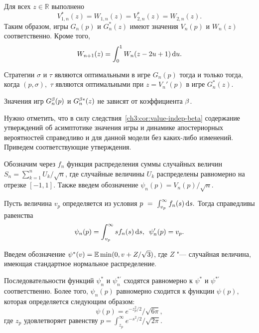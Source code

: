 {\begin{theorem}
  Для всех $z \in \mathbb{R}$ выполнено
  \begin{equation}\label{ch3:eq:duality-relationships}
    V_{1,n}^*(z) = W_{1,n}(z) = V_{2,n}^*(z) = W_{2,n}(z).
  \end{equation}
  Таким образом, игры $G_n(p)$ и $G_n^*(z)$ имеют значения $V_n(p)$ и $W_n(z)$ соответственно.
  Кроме того,
  \begin{equation}\label{ch3:eq:W-recursive}
    W_{n+1}(z) = \int_0^1 W_n(z - 2u + 1) \mathop{}\!\mathrm{d} u.
  \end{equation}
\end{theorem}

\begin{theorem}\label{ch3:thm:optimal-strategies}
  Стратегии $\sigma$ и $\tau$ являются оптимальными в игре $G_n(p)$ тогда и только тогда, когда $(p, \sigma),$ $\tau$ являются оптимальными при $z = V_n'(p)$ в игре $G_n^*(z)$.
\end{theorem}

\begin{corollary}
  \label{ch3:cor:value-indep-beta}
  Значения игр $G^{\beta}_n(p)$ и $G^{\beta*}_n(z)$ не зависят от коэффициента $\beta$.
\end{corollary}

Нужно отметить, что в силу следствия~\ref{ch3:cor:value-indep-beta} содержание утверждений об асимптотике значения игры и динамике апостериорных вероятностей справедливо и для данной модели без каких-либо изменений.
Приведем соответствующие утверждения.

Обозначим через $f_n$ функция распределения суммы случайных величин $S_n = \sum_{k=1}^n U_k / \sqrt{n}$, где случайные величины $U_k$ распределены равномерно на отрезке $[-1, 1]$.
Также введем обозначение $\psi_n(p) = V_n(p)/\sqrt{n}$.

\begin{proposition}
Пусть величина $v_p$ определяется из условия 
$
  p~=~\int_{v_p}^\infty f_n(s) \mathop{}\!\mathrm{d} s.
$
Тогда справедливы равенства
\begin{equation*}
  \psi_n(p) = \int_{v_p}^\infty s f_n(s) \mathop{}\!\mathrm{d} s, \enskip
  \psi'_n(p) = v_p.
\end{equation*}
\end{proposition}

Введем обозначение $\psi^*(v) = \operatorname{\mathbb{E}} \min(0, v + Z/\sqrt{3})$, где $Z$ "--- случайная величина, имеющая стандартное нормальное распределение.

\begin{proposition}
Последовательности функций $\psi^*_n$ и $\psi^{*\prime}_n$ сходятся равномерно к $\psi^*$ и $\psi^{*\prime}$ соответственно.
Более того, $\psi_n(p)$ равномерно сходится к функции $\psi(p)$, которая определяется следующим образом:
\begin{equation*}
  \psi(p) = e^{-z_p^2/2}/\sqrt{6\pi},
\end{equation*}
где $z_p$ удовлетворяет равенству $p = \int_{z_p}^\infty e^{-s^2/2}/\sqrt{2\pi}$.
\end{proposition}

}

